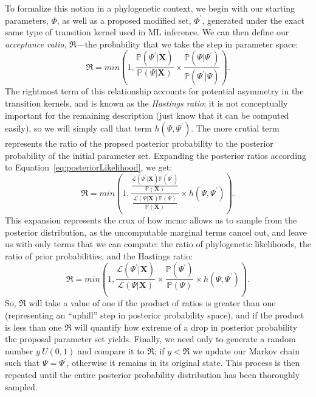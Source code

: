 To formalize this notion in a phylogenetic context, we begin with our starting parameters, $\Phi$, as well as a proposed modified set, $\Phi^{\prime}$, generated under the exact same type of transition kernel used in ML inference.
We can then define our \textit{acceptance ratio}, $\mathfrak{R}$---the probability that we take the step in parameter space:
\begin{equation}
  \mathfrak{R} = 
    min \left( 1, \frac{\mathbb{P}(\Psi^{\prime}|\mathbf{X})}
                       {\mathbb{P}(\Psi|\mathbf{X})} \times 
                         \frac{\mathbb{P}(\Psi|\Psi^{\prime})}
                              {\mathbb{P}(\Psi^{\prime}|\Psi)} \right).
\end{equation}
The rightmost term of this relationship accounts for potential asymmetry in the transition kernels, and is known as the \textit{Hastings ratio}; it is not conceptually important for the remaining description (just know that it can be computed easily), so we will simply call that term $h(\Psi,\Psi^{\prime})$.
The more crutial term represents the ratio of the propsed posterior probability to the posterior probability of the initial parameter set.
Expanding the posterior ratios according to Equation~\ref{eq:posteriorLikelihood}, we get:
\begin{equation}
  \mathfrak{R} =
    min \left( 1, \frac{\frac{\mathcal{L}(\Psi^{\prime}|\mathbf{X}) \mathbb{P}(\Psi^{\prime})}
                             {\mathbb{P}(\mathbf{X})}}
                       {\frac{\mathcal{L}(\Psi|\mathbf{X}) \mathbb{P}(\Psi)}
                             {\mathbb{P}(\mathbf{X})}}
                       \times h(\Psi,\Psi^{\prime}) \right).
\end{equation}
This expansion represents the crux of how \gls{mcmc} allows us to sample from the posterior distribution, as the uncomputable marginal terms cancel out, and leave us with only terms that we can compute: the ratio of phylogenetic likelihoods, the ratio of prior probabilities, and the Hastings ratio:
\begin{equation}
  \mathfrak{R} =
    min \left( 1, \frac{\mathcal{L}(\Psi^{\prime}|\mathbf{X})}
                       {\mathcal{L}(\Psi|\mathbf{X})}
                  \times
                  \frac{\mathbb{P}(\Psi^{\prime})}
                       {\mathbb{P}(\Psi)}
                  \times
                  h(\Psi,\Psi^{\prime}) \right).
\end{equation}
So, $\mathfrak{R}$ will take a value of one if the product of ratios is greater than one (representing an ``uphill'' step in posterior probability space), and if the product is less than one $\mathfrak{R}$ will quantify how extreme of a drop in posterior probability the proposal parameter set yields.
Finally, we need only to generate a random number $y~U(0,1)$ and compare it to $\mathfrak{R}$; if $y < \mathfrak{R}$ we update our Markov chain such that $\Psi = \Psi^{\prime}$, otherwise it remains in its original state.
This process is then repeated until the entire posterior probability distribution has been thoroughly sampled.

